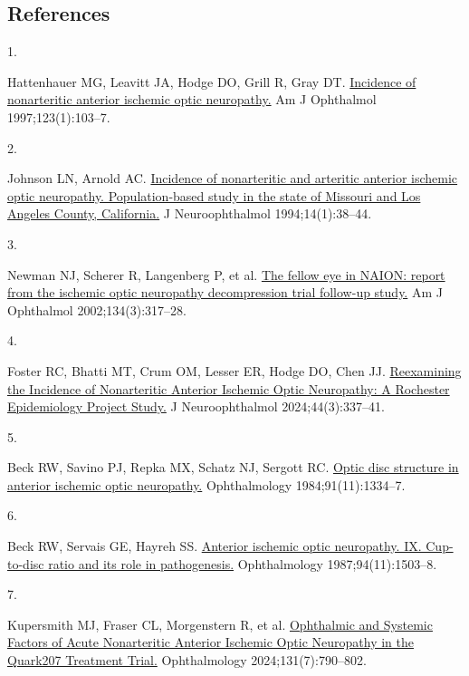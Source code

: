 \documentclass[
  11pt,
]{article}
\newlength{\cslhangindent}
\newlength{\csllabelwidth}
\newenvironment{CSLReferences}[2] %
 {\begin{list}{}{%
  \setlength{\itemindent}{0pt}
  \setlength{\leftmargin}{0pt}
  \setlength{\parsep}{0pt}
  \ifodd #1
   \setlength{\leftmargin}{\cslhangindent}
   \setlength{\itemindent}{-1\cslhangindent}
  \fi
  \setlength{\itemsep}{#2\baselineskip}}}
 {\end{list}}
\newcommand{\CSLLeftMargin}[1]{\parbox[t]{\csllabelwidth}{\strut#1\strut}}
\newcommand{\CSLRightInline}[1]{\parbox[t]{\linewidth - \csllabelwidth}{\strut#1\strut}}
\begin{document}
\subsection*{References}\label{references}

\protect{}\label{refs}
\begin{CSLReferences}{0}{1}
\CSLLeftMargin{1. }%
\CSLRightInline{Hattenhauer MG, Leavitt JA, Hodge DO, Grill R, Gray DT.
\href{https://doi.org/10.1016/s0002-9394(14)70999-7}{{Incidence of
nonarteritic anterior ischemic optic neuropathy.}} Am J Ophthalmol
1997;123(1):103--7. }

\CSLLeftMargin{2. }%
\CSLRightInline{Johnson LN, Arnold AC. \href{}{{Incidence of
nonarteritic and arteritic anterior ischemic optic neuropathy.
Population-based study in the state of Missouri and Los Angeles County,
California.}} J Neuroophthalmol 1994;14(1):38--44. }

\CSLLeftMargin{3. }%
\CSLRightInline{Newman NJ, Scherer R, Langenberg P, et al.
\href{https://doi.org/10.1016/s0002-9394(02)01639-2}{{The fellow eye in
NAION: report from the ischemic optic neuropathy decompression trial
follow-up study.}} Am J Ophthalmol 2002;134(3):317--28. }

\CSLLeftMargin{4. }%
\CSLRightInline{Foster RC, Bhatti MT, Crum OM, Lesser ER, Hodge DO, Chen
JJ. \href{https://doi.org/10.1097/WNO.0000000000002102}{{Reexamining the
Incidence of Nonarteritic Anterior Ischemic Optic Neuropathy: A
Rochester Epidemiology Project Study.}} J Neuroophthalmol
2024;44(3):337--41. }

\CSLLeftMargin{5. }%
\CSLRightInline{Beck RW, Savino PJ, Repka MX, Schatz NJ, Sergott RC.
\href{https://doi.org/10.1016/s0161-6420(84)34146-x}{{Optic disc
structure in anterior ischemic optic neuropathy.}} Ophthalmology
1984;91(11):1334--7. }

\CSLLeftMargin{6. }%
\CSLRightInline{Beck RW, Servais GE, Hayreh SS. \href{}{{Anterior
ischemic optic neuropathy. IX. Cup-to-disc ratio and its role in
pathogenesis.}} Ophthalmology 1987;94(11):1503--8. }

\CSLLeftMargin{7. }%
\CSLRightInline{Kupersmith MJ, Fraser CL, Morgenstern R, et al.
\href{https://doi.org/10.1016/j.ophtha.2024.01.011}{{Ophthalmic and
Systemic Factors of Acute Nonarteritic Anterior Ischemic Optic
Neuropathy in the Quark207 Treatment Trial.}} Ophthalmology
2024;131(7):790--802. }


\end{CSLReferences}
\end{document}
